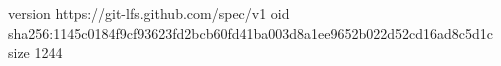 version https://git-lfs.github.com/spec/v1
oid sha256:1145c0184f9cf93623fd2bcb60fd41ba003d8a1ee9652b022d52cd16ad8c5d1c
size 1244

